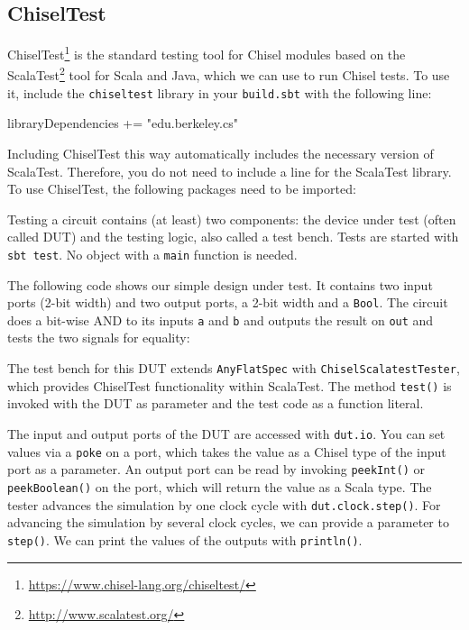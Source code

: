 \documentclass[%
    10pt,
    headinclude, footexclude,
    openright, %
    notitlepage,
    cleardoubleempty,
    headsepline,
    pointlessnumbers,
    bibtotoc, idxtotoc,
    ]{scrbook}
\newcommand{\code}[1]{{\lstinline[basicstyle=\small\ttfamily]{#1}}}
\newcommand{\myref}[2]{\href{#1}{#2}}
\renewcommand{\myref}[2]{{#2}{\footnote{\url{#1}}}}
\begin{document}
\subsection{ChiselTest}


\myref{https://www.chisel-lang.org/chiseltest/}{ChiselTest} is the standard testing tool
for Chisel modules based on the \myref{http://www.scalatest.org/}{ScalaTest} tool for Scala
and Java, which we can use to run Chisel tests.
To use it, include the \code{chiseltest} library in your \code{build.sbt} with the following line:

\begin{chisel}
libraryDependencies += "edu.berkeley.cs" %
\end{chisel}

\noindent Including ChiselTest this way automatically includes the necessary version of ScalaTest.
Therefore, you do not need to include a line for the ScalaTest library.
To use ChiselTest, the following packages need to be imported:


\noindent Testing a circuit contains (at least) two components: the device under test (often
called DUT) and the testing logic, also called a test bench. Tests are started with \code{sbt test}.
No object with a \code{main} function is needed.

The following code shows our simple design under test. It contains two input
ports (2-bit width) and two output ports, a 2-bit width and a \code{Bool}. The circuit does a bit-wise AND
to its inputs \code{a} and \code{b} and outputs the result on \code{out} and tests the two signals for
equality:


The test bench for this DUT extends \code{AnyFlatSpec} with \code{ChiselScalatestTester},
which provides ChiselTest functionality within ScalaTest.
The method \code{test()} is invoked with the DUT as parameter and the test code as a function literal.



The input and output ports of the DUT are accessed with \code{dut.io}.
You can set values via a \code{poke} on a port, which takes the value as a Chisel type of the
input port as a parameter.
An output port can be read by invoking \code{peekInt()} or \code{peekBoolean()} on the port,
which will return the value as a Scala type.
The tester advances the simulation by one clock cycle with \code{dut.clock.step()}.
For advancing the simulation by several clock cycles, we can provide a parameter to
\code{step()}.
We can print the values of the outputs with \code{println()}.
\end{document}
